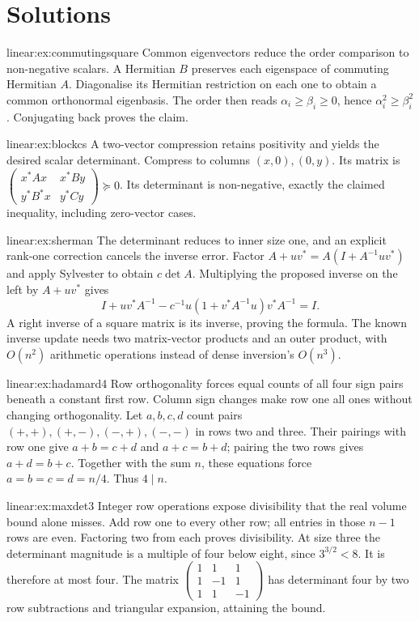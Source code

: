 \section{Solutions}
\begin{solution}{linear:ex:commutingsquare}
\idea Common eigenvectors reduce the order comparison to non-negative scalars.
\writeup A Hermitian $B$ preserves each eigenspace of commuting Hermitian $A$. Diagonalise its Hermitian restriction on each one to obtain a common orthonormal eigenbasis. The order then reads $\alpha_i\ge\beta_i\ge0$, hence $\alpha_i^2\ge\beta_i^2$. Conjugating back proves the claim.
\end{solution}
\begin{solution}{linear:ex:blockcs}
\idea A two-vector compression retains positivity and yields the desired scalar determinant.
\writeup Compress to columns $(x,0),(0,y)$. Its matrix is $\begin{pmatrix}x^*Ax&x^*By\\y^*B^*x&y^*Cy\end{pmatrix}\succeq0$. Its determinant is non-negative, exactly the claimed inequality, including zero-vector cases.
\end{solution}
\begin{solution}{linear:ex:sherman}
\idea The determinant reduces to inner size one, and an explicit rank-one correction cancels the inverse error.
\writeup Factor $A+uv^*=A(I+A^{-1}uv^*)$ and apply Sylvester to obtain $c\det A$. Multiplying the proposed inverse on the left by $A+uv^*$ gives
\[I+uv^*A^{-1}-c^{-1}u(1+v^*A^{-1}u)v^*A^{-1}=I.
\]
A right inverse of a square matrix is its inverse, proving the formula. The known inverse update needs two matrix-vector products and an outer product, with $O(n^2)$ arithmetic operations instead of dense inversion's $O(n^3)$.
\end{solution}
\begin{solution}{linear:ex:hadamard4}
\idea Row orthogonality forces equal counts of all four sign pairs beneath a constant first row.
\writeup Column sign changes make row one all ones without changing orthogonality. Let $a,b,c,d$ count pairs $(+,+),(+,-),(-,+),(-,-)$ in rows two and three. Their pairings with row one give $a+b=c+d$ and $a+c=b+d$; pairing the two rows gives $a+d=b+c$. Together with the sum $n$, these equations force $a=b=c=d=n/4$. Thus $4\mid n$.
\end{solution}
\begin{solution}{linear:ex:maxdet3}
\idea Integer row operations expose divisibility that the real volume bound alone misses.
\writeup Add row one to every other row; all entries in those $n-1$ rows are even. Factoring two from each proves divisibility. At size three the determinant magnitude is a multiple of four below eight, since $3^{3/2}<8$. It is therefore at most four. The matrix $\begin{pmatrix}1&1&1\\1&-1&1\\1&1&-1\end{pmatrix}$ has determinant four by two row subtractions and triangular expansion, attaining the bound.
\end{solution}
